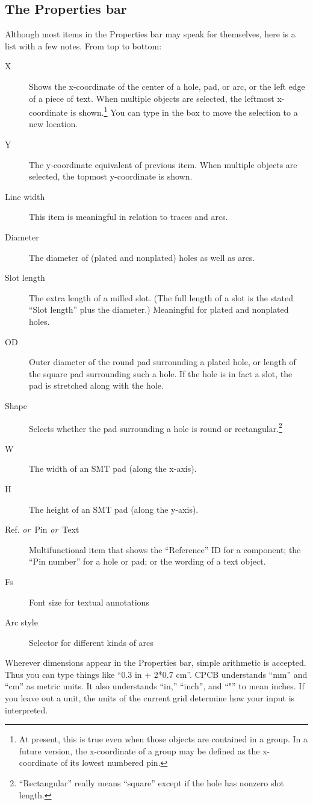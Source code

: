 \documentclass[11pt]{report}
\begin{document}
\subsection{The Properties bar}
Although most items in the Properties bar may speak for themselves,
here is a list with a few notes. From top to bottom:
\begin{description}
\item[X] Shows the x-coordinate of the center of a hole, pad, or
  arc, or the left edge of a piece of text. When multiple objects
  are selected, the leftmost x-coordinate is shown.\footnote{At present, this
    is true even when those objects are contained in a group. In a
    future version, the x-coordinate of a group may be defined as the
    x-coordinate of its lowest numbered pin.} You can type in the box
  to move the selection to a new location.
\item[Y] The y-coordinate equivalent of previous item. When
  multiple objects are selected, the topmost
  y-coordinate is shown.
\item[Line width] This item is meaningful in relation to
  traces and arcs.
\item[Diameter] The diameter of (plated and nonplated) holes as well
  as arcs.
\item[Slot length] The extra length of a milled slot. (The full
  length of a slot is the stated ``Slot length'' plus the diameter.)
  Meaningful for plated and nonplated holes.
\item[OD] Outer diameter of the round pad surrounding a plated hole, or
  length of the square pad surrounding such a hole. If the hole is in
  fact a slot, the pad is stretched along with the hole.
\item[Shape] Selects whether the pad surrounding a hole is round or
  rectangular.\footnote{``Rectangular'' really means ``square''
    except if the hole has nonzero slot length.}
\item[W] The width of an SMT pad (along the x-axis).
\item[H] The height of an SMT pad (along the y-axis).
\item[Ref. {\normalfont\itshape or}~Pin {\normalfont\itshape
    or}~Text] Multifunctional item that shows the ``Reference'' ID for
  a component; the ``Pin number'' for a hole or pad; or the wording of
  a text object.
\item[Fs] Font size for textual annotations
\item[Arc style] Selector for different kinds of arcs
\end{description}
%
Wherever dimensions appear in the Properties bar, simple arithmetic is
accepted. Thus you can type things like ``0.3 in + 2*0.7 cm''. CPCB
understands ``mm'' and ``cm'' as metric units. It also understands
``in,'' ``inch'', and ``"'' to mean inches. If you leave out a unit,
the units of the current grid determine how your input is interpreted.
\end{document}
